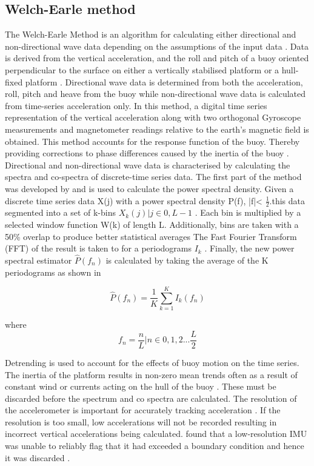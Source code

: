 \subsection{Welch-Earle method}
\label{welchearl}
The Welch-Earle Method is an algorithm for calculating either directional and non-directional wave data depending on the assumptions of the input data \cite{earle1996nondirectional}. Data is derived from the vertical acceleration, and the roll and pitch of a buoy oriented perpendicular to the surface on either a vertically stabilised platform or a hull-fixed platform \cite{earle1996nondirectional}. Directional wave data is determined from both the acceleration, roll, pitch and heave from the buoy while non-directional wave data is calculated from time-series acceleration only. In this method, a digital time series representation of the vertical acceleration along with two orthogonal Gyroscope measurements and magnetometer readings relative to the earth’s magnetic field is obtained. This method accounts for the response function of the buoy. Thereby providing corrections to phase differences caused by the inertia of the buoy \cite{earle1996nondirectional}. Directional and non-directional wave data is characterised by calculating the spectra and co-spectra of discrete-time series data. The first part of the method was developed by \textcite{welch1967use} and is used to calculate the power spectral density.
Given a discrete time series data X(j) with a power spectral density P(f), |f|< $\frac{1}{2}$.this data segmented into a set of k-bins $X_k(j) | j \in {0,L-1}$ \cite{welch1967use}. Each bin is multiplied by a selected window function W(k) of length L. Additionally, bins are taken with a 50\% overlap to produce better statistical averages \cite{earle1996nondirectional} The Fast Fourier Transform (FFT) of the result is taken to for a periodograms $I_k$ \cite{earle1996nondirectional}. Finally, the new power spectral estimator $\hat{P}(f_n)$ is calculated by taking the average of the K periodograms as shown in \textcite{welch1967use}

\begin{equation}
	\hat{P}(f_n) = \frac{1}{K}\sum^K_{k=1}I_k(f_n)
\end{equation}

where 
\begin{equation}
	f_n = \frac{n}{L} | n \in 0,1,2... \frac{L}{2}
\end{equation}

Detrending is used to account for the effects of buoy motion on the time series. The inertia of the platform results in non-zero mean trends often as a result of constant wind or currents acting on the hull of the buoy \cite{earle1996nondirectional}. These must be discarded before the spectrum and co spectra are calculated. The resolution of the accelerometer is important for accurately tracking acceleration \cite{kohout2015device}. If the resolution is too small, low accelerations will not be recorded resulting in incorrect vertical accelerations being calculated. \textcite{kohout2015device} found that a low-resolution IMU was unable to reliably flag that it had exceeded a boundary condition and hence it was discarded \cite{kohout2015device}.\par 

